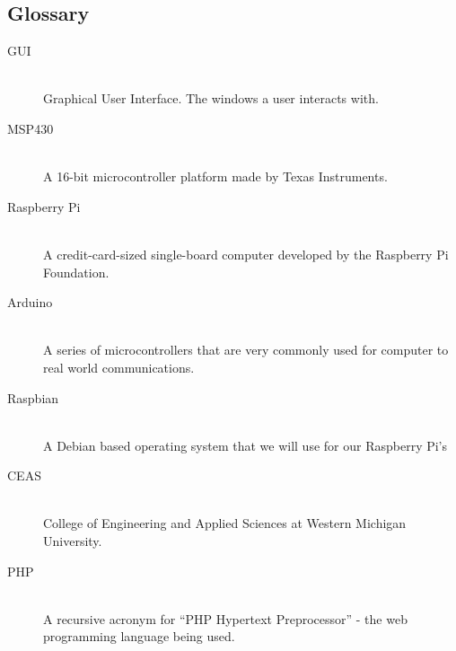 \documentclass{report}
\begin{document}
\subsection*{Glossary}
\begin{description}
\item [GUI] \hfill \\
Graphical User Interface. The windows a user interacts with.
\item [MSP430] \hfill \\
A 16-bit microcontroller platform made by Texas Instruments.
\item [Raspberry Pi] \hfill \\
 A credit-card-sized single-board computer developed by the Raspberry Pi Foundation.
\item [Arduino] \hfill \\
A series of microcontrollers that are very commonly used for computer to real world communications.
\item [Raspbian] \hfill \\
 A Debian based operating system that we will use for our Raspberry Pi’s
\item [CEAS] \hfill \\
College of Engineering and Applied Sciences at Western Michigan University.
\item [PHP] \hfill \\
A recursive acronym for “PHP Hypertext Preprocessor” - the web programming language being used.
\end{description}
\newpage
\end{document}
